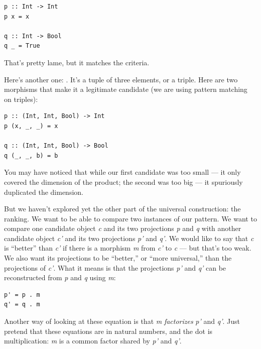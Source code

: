 \begin{verbatim}
p :: Int -> Int
p x = x

q :: Int -> Bool
q _ = True
\end{verbatim}
That's pretty lame, but it matches the criteria.

Here's another one: . It's a tuple of three
elements, or a triple. Here are two morphisms that make it a legitimate
candidate (we are using pattern matching on triples):

\begin{verbatim}
p :: (Int, Int, Bool) -> Int
p (x, _, _) = x

q :: (Int, Int, Bool) -> Bool
q (_, _, b) = b
\end{verbatim}
You may have noticed that while our first candidate was too small --- it
only covered the  dimension of the product; the second was
too big --- it spuriously duplicated the  dimension.

But we haven't explored yet the other part of the universal
construction: the ranking. We want to be able to compare two instances
of our pattern. We want to compare one candidate object \emph{c} and its
two projections \emph{p} and \emph{q} with another candidate object
\emph{c'} and its two projections \emph{p'} and \emph{q'}. We would like
to say that \emph{c} is ``better'' than \emph{c'} if there is a morphism
\emph{m} from \emph{c'} to \emph{c} --- but that's too weak. We also
want its projections to be ``better,'' or ``more universal,'' than the
projections of \emph{c'}. What it means is that the projections
\emph{p'} and \emph{q'} can be reconstructed from \emph{p} and \emph{q}
using \emph{m}:

\begin{verbatim}
p' = p . m
q' = q . m
\end{verbatim}

\begin{figure}[H]
\centering
{}
\end{figure}

\noindent
Another way of looking at these equation is that \emph{m}
\emph{factorizes} \emph{p'} and \emph{q'}. Just pretend that these
equations are in natural numbers, and the dot is multiplication:
\emph{m} is a common factor shared by \emph{p'} and \emph{q'}.

